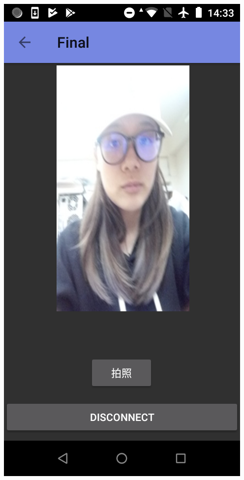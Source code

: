 \documentclass[a0paper,portrait]{baposter}
\begin{document}
\begin{poster}
{\begin{itemize}
\includegraphics[scale=0.15]{game03.png}
\end{itemize}
}



\end{poster}
\end{document}
